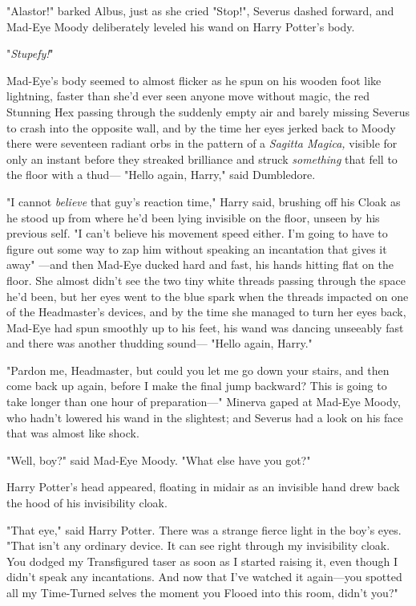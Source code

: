 "Alastor!" barked Albus, just as she cried "Stop!", Severus dashed forward, and
Mad-Eye Moody deliberately leveled his wand on Harry Potter's body.

"\emph{Stupefy!}"

Mad-Eye's body seemed to almost flicker as he spun on his wooden foot like
lightning, faster than she'd ever seen anyone move without magic, the red
Stunning Hex passing through the suddenly empty air and barely missing Severus
to crash into the opposite wall, and by the time her eyes jerked back to Moody
there were seventeen radiant orbs in the pattern of a \emph{Sagitta Magica,}
visible for only an instant before they streaked brilliance and struck
\emph{something} that fell to the floor with a thud—
\sbreak
"Hello again, Harry," said Dumbledore.

"I cannot \emph{believe} that guy's reaction time," Harry said, brushing off
his Cloak as he stood up from where he'd been lying invisible on the floor,
unseen by his previous self. "I can't believe his movement speed either. I'm
going to have to figure out some way to zap him without speaking an incantation
that gives it away{\el}"
\sbreak
—and then Mad-Eye ducked hard and fast, his hands hitting flat on the floor.
She almost didn't see the two tiny white threads passing through the space he'd
been, but her eyes went to the blue spark when the threads impacted on one of
the Headmaster's devices, and by the time she managed to turn her eyes back,
Mad-Eye had spun smoothly up to his feet, his wand was dancing unseeably fast
and there was another thudding sound—
\sbreak
"Hello again, Harry."

"Pardon me, Headmaster, but could you let me go down your stairs, and then come
back up again, before I make the final jump backward? This is going to take
longer than one hour of preparation—"
\sbreak
Minerva gaped at Mad-Eye Moody, who hadn't lowered his wand in the slightest;
and Severus had a look on his face that was almost like shock.

"Well, boy?" said Mad-Eye Moody. "What else have you got?"

Harry Potter's head appeared, floating in midair as an invisible hand drew back
the hood of his invisibility cloak.

"That eye," said Harry Potter. There was a strange fierce light in the boy's
eyes. "That isn't any ordinary device. It can see right through my invisibility
cloak. You dodged my Transfigured taser as soon as I started raising it, even
though I didn't speak any incantations. And now that I've watched it
again—you spotted all my Time-Turned selves the moment you Flooed into this
room, didn't you?"

